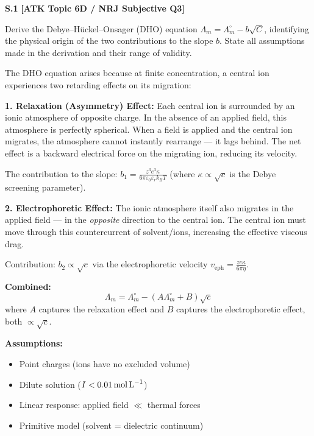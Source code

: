 \begin{problembox}
\textbf{S.1} \hfill \textbf{[ATK Topic 6D / NRJ Subjective Q3]}

Derive the Debye--H\"{u}ckel--Onsager (DHO) equation $\Lambda_m = \Lambda_m^\circ - b\sqrt{C}$, identifying the physical origin of the two contributions to the slope $b$. State all assumptions made in the derivation and their range of validity.
\end{problembox}
\begin{solution}
The DHO equation arises because at finite concentration, a central ion experiences two retarding effects on its migration:

\textbf{1. Relaxation (Asymmetry) Effect:} Each central ion is surrounded by an ionic atmosphere of opposite charge. In the absence of an applied field, this atmosphere is perfectly spherical. When a field is applied and the central ion migrates, the atmosphere cannot instantly rearrange --- it lags behind. The net effect is a backward electrical force on the migrating ion, reducing its velocity.

The contribution to the slope: $b_1 = \frac{z^3 e^3 \kappa}{6\pi\varepsilon_0\varepsilon_r k_B T}$ (where $\kappa \propto \sqrt{c}$ is the Debye screening parameter).

\textbf{2. Electrophoretic Effect:} The ionic atmosphere itself also migrates in the applied field --- in the \textit{opposite} direction to the central ion. The central ion must move through this countercurrent of solvent/ions, increasing the effective viscous drag.

Contribution: $b_2 \propto \sqrt{c}$ via the electrophoretic velocity $v_{\text{eph}} = \frac{ze\kappa}{6\pi\eta}$.

\textbf{Combined:}
\begin{equation*}
    \Lambda_m = \Lambda_m^\circ - (A\Lambda_m^\circ + B)\sqrt{c}
\end{equation*}
where $A$ captures the relaxation effect and $B$ captures the electrophoretic effect, both $\propto \sqrt{c}$.

\textbf{Assumptions:}
\begin{itemize}
    \item Point charges (ions have no excluded volume)
    \item Dilute solution ($I < 0.01\,\text{mol\,L}^{-1}$)
    \item Linear response: applied field $\ll$ thermal forces
    \item Primitive model (solvent = dielectric continuum)
\end{itemize}
\end{solution}

